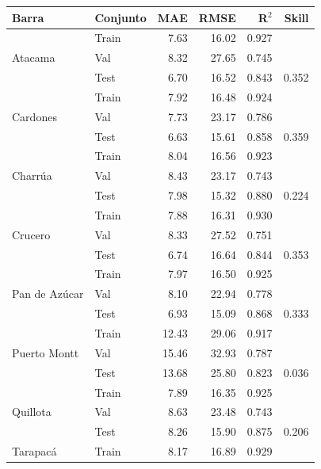 \begin{table}[htbp]
    \centering
    \small
    \begin{tabular}{llrrrr}
        \toprule
        Barra & Conjunto & MAE & RMSE & R$^2$ & Skill \\
        \midrule
        \multirow{3}{*}{Atacama}
            & Train & 7.63 & 16.02 & 0.927 & \\
            & Val   & 8.32 & 27.65 & 0.745 & \\
            & Test  & 6.70 & 16.52 & 0.843 & 0.352 \\
        \midrule
        \multirow{3}{*}{Cardones}
            & Train & 7.92 & 16.48 & 0.924 & \\
            & Val   & 7.73 & 23.17 & 0.786 & \\
            & Test  & 6.63 & 15.61 & 0.858 & 0.359 \\
        \midrule
        \multirow{3}{*}{Charrúa}
            & Train & 8.04 & 16.56 & 0.923 & \\
            & Val   & 8.43 & 23.17 & 0.743 & \\
            & Test  & 7.98 & 15.32 & 0.880 & 0.224 \\
        \midrule
        \multirow{3}{*}{Crucero}
            & Train & 7.88 & 16.31 & 0.930 & \\
            & Val   & 8.33 & 27.52 & 0.751 & \\
            & Test  & 6.74 & 16.64 & 0.844 & 0.353 \\
        \midrule
        \multirow{3}{*}{Pan de Azúcar}
            & Train & 7.97 & 16.50 & 0.925 & \\
            & Val   & 8.10 & 22.94 & 0.778 & \\
            & Test  & 6.93 & 15.09 & 0.868 & 0.333 \\
        \midrule
        \multirow{3}{*}{Puerto Montt}
            & Train & 12.43 & 29.06 & 0.917 & \\
            & Val   & 15.46 & 32.93 & 0.787 & \\
            & Test  & 13.68 & 25.80 & 0.823 & 0.036 \\
        \midrule
        \multirow{3}{*}{Quillota}
            & Train & 7.89 & 16.35 & 0.925 & \\
            & Val   & 8.63 & 23.48 & 0.743 & \\
            & Test  & 8.26 & 15.90 & 0.875 & 0.206 \\
        \midrule
        \multirow{3}{*}{Tarapacá}
            & Train & 8.17 & 16.89 & 0.929 & \\

\end{tabular}
\end{table}
